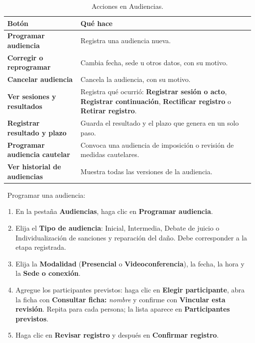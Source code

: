 \begin{table}[H]
  \centering
  \caption{Acciones en Audiencias.}\label{tab:acciones-audiencias}
  \begin{tabularx}{\textwidth}{L{4.6cm} Y}
    \toprule
    \textbf{Botón} & \textbf{Qué hace} \\
    \midrule
    \textbf{Programar audiencia}         & Registra una audiencia nueva. \\
    \textbf{Corregir o reprogramar}      & Cambia fecha, sede u otros datos, con su motivo. \\
    \textbf{Cancelar audiencia}          & Cancela la audiencia, con su motivo. \\
    \textbf{Ver sesiones y resultados}   & Registra qué ocurrió: \textbf{Registrar sesión o acto}, \textbf{Registrar continuación}, \textbf{Rectificar registro} o \textbf{Retirar registro}. \\
    \textbf{Registrar resultado y plazo} & Guarda el resultado y el plazo que genera en un solo paso. \\
    \textbf{Programar audiencia cautelar}& Convoca una audiencia de imposición o revisión de medidas cautelares. \\
    \textbf{Ver historial de audiencias} & Muestra todas las versiones de la audiencia. \\
    \bottomrule
  \end{tabularx}
\end{table}

\pasos\ Programar una audiencia:
\begin{enumerate}
  \item En la pestaña \textbf{Audiencias}, haga clic en
        \textbf{Programar audiencia}.
  \item Elija el \textbf{Tipo de audiencia}: Inicial, Intermedia, Debate de
        juicio o Individualización de sanciones y reparación del daño. Debe
        corresponder a la etapa registrada.
  \item Elija la \textbf{Modalidad} (\textbf{Presencial} o
        \textbf{Videoconferencia}), la fecha, la hora y la
        \textbf{Sede o conexión}.
  \item Agregue los participantes previstos: haga clic en
        \textbf{Elegir participante}, abra la ficha con
        \textbf{Consultar ficha: }\emph{nombre} y confirme con
        \textbf{Vincular esta revisión}. Repita para cada persona; la lista
        aparece en \textbf{Participantes previstos}.
  \item Haga clic en \textbf{Revisar registro} y después en
        \textbf{Confirmar registro}.
\end{enumerate}

